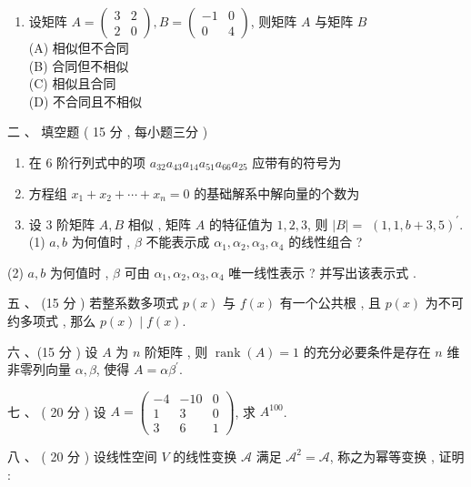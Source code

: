\documentclass[10pt]{article}
\begin{document}
{\begin{enumerate}
  \item  设矩阵  $A=\left(\begin{array}{ll}3 & 2 \\ 2 & 0\end{array}\right), B=\left(\begin{array}{cc}-1 & 0 \\ 0 & 4\end{array}\right)$,  则矩阵  $A$  与矩阵  $B$\\
(A)  相似但不合同 \\
(B)  合同但不相似 \\
(C)  相似且合同 \\
(D)  不合同且不相似 

\end{enumerate}
 二 、 填空题 ( 15  分 ,  每小题三分 )

\begin{enumerate}
  \item  在  6  阶行列式中的项  $a_{32} a_{43} a_{14} a_{51} a_{66} a_{25}$  应带有的符号为 

  \item  方程组  $x_{1}+x_{2}+\cdots+x_{n}=0$  的基础解系中解向量的个数为 

  \item  设  3  阶矩阵  $A, B$  相似 ,  矩阵  $A$  的特征值为  $1,2,3$,  则  $|B|=$ $(1,1, b+3,5)^{\prime}$. (1) $a, b$  为何值时 , $\beta$  不能表示成  $\alpha_{1}, \alpha_{2}, \alpha_{3}, \alpha_{4}$  的线性组合 ?

\end{enumerate}
(2) $a, b$  为何值时 , $\beta$  可由  $\alpha_{1}, \alpha_{2}, \alpha_{3}, \alpha_{4}$  唯一线性表示 ?  并写出该表示式 .

 五 、 (15  分 )  若整系数多项式  $p(x)$  与  $f(x)$  有一个公共根 ,  且  $p(x)$  为不可约多项式 ,  那么  $p(x) \mid f(x)$.

 六 、(15  分 )  设  $A$  为  $n$  阶矩阵 ,  则  $\operatorname{rank}(A)=1$  的充分必要条件是存在  $n$  维非零列向量  $\alpha, \beta$,  使得  $A=\alpha \beta^{\prime}$.

 七 、 ( 20  分 )  设  $A=\left(\begin{array}{ccc}-4 & -10 & 0 \\ 1 & 3 & 0 \\ 3 & 6 & 1\end{array}\right)$,  求  $A^{100}$.

 八 、 ( 20  分 )  设线性空间  $V$  的线性变换  $\mathscr{A}$  满足  $\mathscr{A}^{2}=\mathscr{A}$,  称之为幂等变换 ,  证明 :

}
\end{document}
